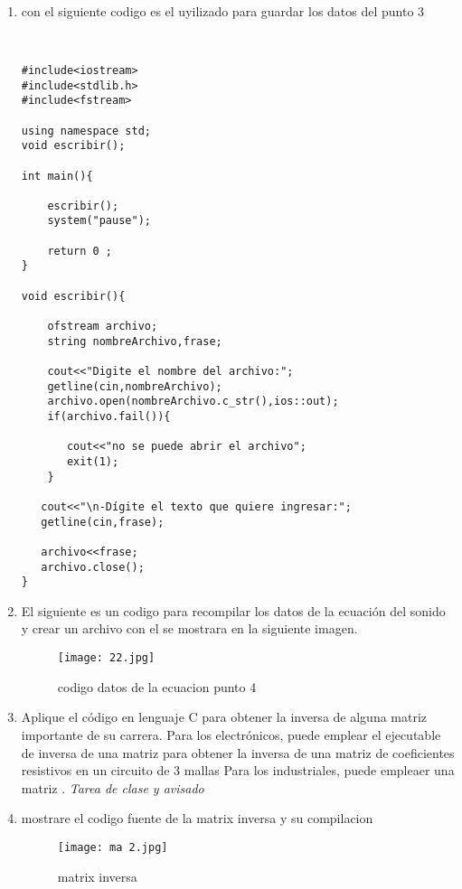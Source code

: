 \documentclass[ twoside,twocolumn,9pt, letterpape]{article}
\begin{document}
\begin{enumerate}
\item con el siguiente codigo es el uyilizado para guardar los datos del punto 3

\begin{verbatim}


#include<iostream>
#include<stdlib.h>
#include<fstream> 

using namespace std;
void escribir();

int main(){
	
	escribir();
	system("pause");
	
	return 0 ;
}

void escribir(){
	
	ofstream archivo; 
	string nombreArchivo,frase; 
	
	cout<<"Digite el nombre del archivo:";
	getline(cin,nombreArchivo);
	archivo.open(nombreArchivo.c_str(),ios::out);  
	if(archivo.fail()){   
		
       cout<<"no se puede abrir el archivo";
       exit(1);
	}
	
   cout<<"\n-Dígite el texto que quiere ingresar:";
   getline(cin,frase);
   
   archivo<<frase;
   archivo.close(); 
}

\end{verbatim}

\item El siguiente es un codigo para recompilar los datos de la ecuación del sonido y crear un archivo con el se mostrara en la siguiente imagen.

\begin{figure}[h!]
\centering 
\texttt{[image: 22.jpg]}
\caption{ codigo datos de la ecuacion punto 4}
\label{imagen: 6}
\end{figure}



\item Aplique el código en lenguaje C para obtener la inversa de  alguna matriz importante de su carrera. Para los electrónicos, puede emplear el ejecutable de inversa de una matriz para obtener la inversa de una matriz de coeficientes resistivos en un circuito de 3 mallas Para los industriales, puede empleaer una matriz . {\it Tarea de clase y avisado}\\


\item mostrare el codigo fuente de la matrix inversa y su compilacion 

\begin{figure}[h!]
\centering 
\texttt{[image: ma 2.jpg]}
\caption{ matrix inversa }
\label{imagen: 7}
\end{figure}

\end{enumerate}
\end{document}
